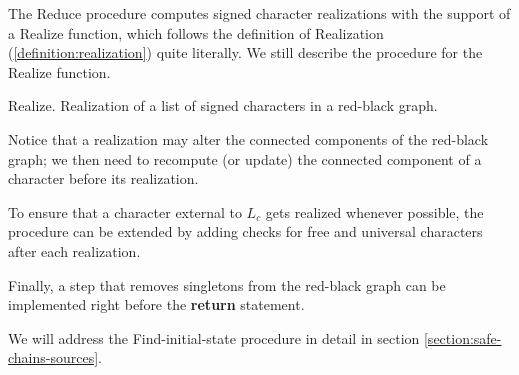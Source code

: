 The Reduce procedure computes signed character realizations with the support of a Realize function, which follows the definition of Realization (\ref{definition:realization}) quite literally.  We still describe the procedure for the Realize function.

\pagebreak %

\begin{algorithm}[h]
  \caption{Realize. Realization of a list of signed characters in a red-black graph.}\label{algorithm:realize}



  \BlankLine


  \BlankLine

  \Return \grb{}\;
\end{algorithm}

Notice that a realization may alter the connected components of the red-black graph; we then need to recompute (or update) the connected component of a character \character[][\pm] before its realization.

To ensure that a character external to $L_{c}$ gets realized whenever possible, the procedure can be extended by adding checks for free and universal characters after each realization.

Finally, a step that removes singletons from the red-black graph can be implemented right before the \textbf{return} statement.

We will address the Find-initial-state procedure in detail in section \ref{section:safe-chains-sources}.

